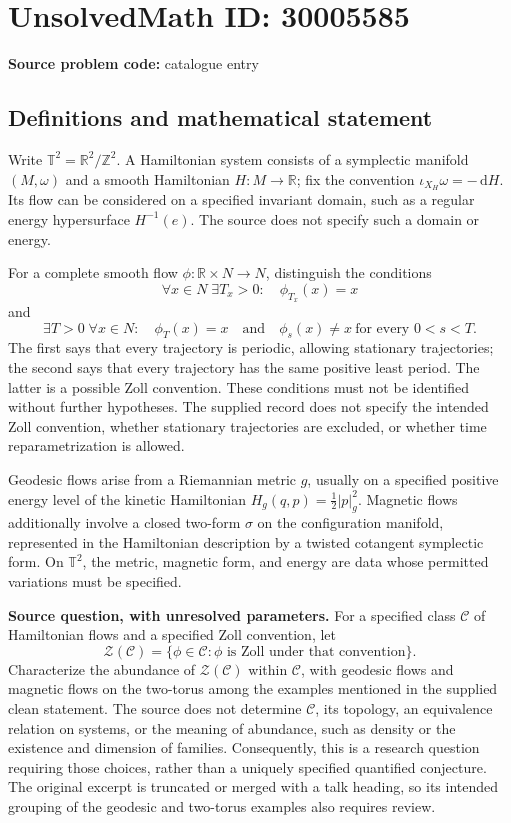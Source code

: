 \documentclass[11pt]{article}
\newcommand{\Z}{\mathbb{Z}}
\newcommand{\R}{\mathbb{R}}
\newcommand{\dd}{\,\mathrm{d}}
\begin{document}
\section*{UnsolvedMath ID: 30005585}
\textbf{Source problem code:} catalogue entry
\subsection{Definitions and mathematical statement}
Write \(\mathbb T^2=\R^2/\Z^2\). A Hamiltonian system consists of a symplectic manifold \((M,\omega)\) and a smooth Hamiltonian \(H:M\to\R\); fix the convention \(\iota_{X_H}\omega=-\dd H\). Its flow can be considered on a specified invariant domain, such as a regular energy hypersurface \(H^{-1}(e)\). The source does not specify such a domain or energy.

For a complete smooth flow \(\phi:\R\times N\to N\), distinguish the conditions
\[
\forall x\in N\;\exists T_x>0:\quad \phi_{T_x}(x)=x
\]
and
\[
\exists T>0\;\forall x\in N:\quad
\phi_T(x)=x\quad\text{and}\quad
\phi_s(x)\ne x\ \text{for every }0<s<T.
\]
The first says that every trajectory is periodic, allowing stationary trajectories; the second says that every trajectory has the same positive least period. The latter is a possible Zoll convention. These conditions must not be identified without further hypotheses. The supplied record does not specify the intended Zoll convention, whether stationary trajectories are excluded, or whether time reparametrization is allowed.

Geodesic flows arise from a Riemannian metric \(g\), usually on a specified positive energy level of the kinetic Hamiltonian \(H_g(q,p)=\tfrac12|p|_g^2\). Magnetic flows additionally involve a closed two-form \(\sigma\) on the configuration manifold, represented in the Hamiltonian description by a twisted cotangent symplectic form. On \(\mathbb T^2\), the metric, magnetic form, and energy are data whose permitted variations must be specified.

\textbf{Source question, with unresolved parameters.} For a specified class \(\mathcal C\) of Hamiltonian flows and a specified Zoll convention, let
\[
\mathcal Z(\mathcal C)=\{\phi\in\mathcal C:\phi\text{ is Zoll under that convention}\}.
\]
Characterize the abundance of \(\mathcal Z(\mathcal C)\) within \(\mathcal C\), with geodesic flows and magnetic flows on the two-torus among the examples mentioned in the supplied clean statement. The source does not determine \(\mathcal C\), its topology, an equivalence relation on systems, or the meaning of abundance, such as density or the existence and dimension of families. Consequently, this is a research question requiring those choices, rather than a uniquely specified quantified conjecture. The original excerpt is truncated or merged with a talk heading, so its intended grouping of the geodesic and two-torus examples also requires review.
\end{document}
